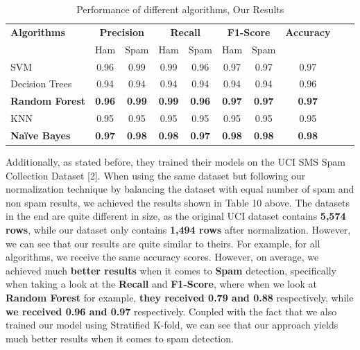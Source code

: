 \documentclass{article}
\begin{document}
\begin{table}[htbp]
    \centering
    \caption{Performance of different algorithms, Our Results} %
    \label{tab:performance} %
    
    \begin{tabular}{l cccc cccc c}
    \toprule
    \textbf{Algorithms} & \multicolumn{2}{c}{\textbf{Precision}} & \multicolumn{2}{c}{\textbf{Recall}} & \multicolumn{2}{c}{\textbf{F1-Score}} & \textbf{Accuracy} \\
    \cmidrule(lr){2-3} \cmidrule(lr){4-5} \cmidrule(lr){6-7}
    & Ham & Spam & Ham & Spam & Ham & Spam & \\
    \midrule
    SVM & 0.96 & 0.99 & 0.99 & 0.96 & 0.97 & 0.97 & 0.97 \\
    Decision Trees & 0.94 & 0.94 & 0.94 & 0.94 & 0.94 & 0.94 & 0.96 \\
    \textbf{Random Forest} & \textbf{0.96} & \textbf{0.99} & \textbf{0.99} & \textbf{0.96} & \textbf{0.97} & \textbf{0.97} & \textbf{0.97} \\
    KNN & 0.95 & 0.95 & 0.95 & 0.95 & 0.95 & 0.95 & 0.95 \\
    \textbf{Naïve Bayes} & \textbf{0.97} & \textbf{0.98} & \textbf{0.98} & \textbf{0.97} & \textbf{0.98} & \textbf{0.98} & \textbf{0.98} \\
    \bottomrule
    \end{tabular}
\end{table}



\noindent
Additionally, as stated before, they trained their models on the UCI SMS Spam Collection Dataset [2]. When using the same dataset but following our normalization technique by balancing the dataset with equal number of spam and non spam results, we achieved the results shown in Table 10 above. The datasets in the end are quite different in size, as the original UCI dataset contains \textbf{5,574 rows}, while our dataset only contains \textbf{1,494 rows} after normalization. However, we can see that our results are quite similar to theirs. For example, for all algorithms, we receive the same accuracy scores. However, on average, we achieved much \textbf{better results} when it comes to \textbf{Spam} detection, specifically when taking a look at the \textbf{Recall} and \textbf{F1-Score}, where when we look at \textbf{Random Forest} for example, \textbf{they received 0.79 and 0.88} respectively, while \textbf{we received 0.96 and 0.97} respectively. Coupled with the fact that we also trained our model using Stratified K-fold, we can see that our approach yields much better results when it comes to spam detection.
\newline
\end{document}
